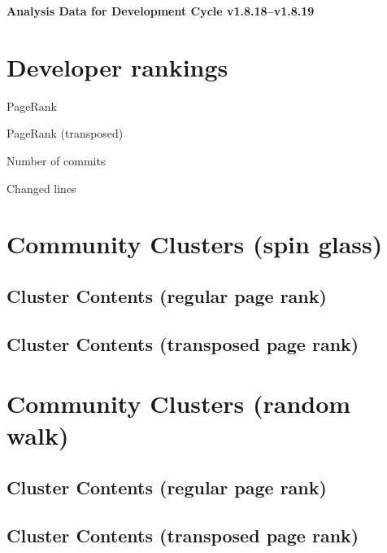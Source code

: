 \documentclass{article}
\begin{document}
\setlength{\parindent}{0pt}
\begin{center}
\begin{Large}
\textbf{Analysis Data for Development Cycle v1.8.18--v1.8.19}
\end{Large}
\end{center}
\section{Developer rankings}
\begin{small}\renewcommand{\tabcolsep}{1pt}
\begin{minipage}{0.5\linewidth}
PageRank\\

\end{minipage}%
\begin{minipage}{0.5\linewidth}
PageRank (transposed)\\

\end{minipage}

\renewcommand{\tabcolsep}{5pt}
\begin{minipage}{0.5\linewidth}
Number of commits\\

\end{minipage}%
\begin{minipage}{0.5\linewidth}
Changed lines\\

\end{minipage}
\end{small}
\newpage\section{Community Clusters (spin glass)}
\subsection{Cluster Contents (regular page rank)}
\newpage\subsection{Cluster Contents (transposed page rank)}
\newpage\section{Community Clusters (random walk)}
\subsection{Cluster Contents (regular page rank)}
\newpage\subsection{Cluster Contents (transposed page rank)}
\end{document}
